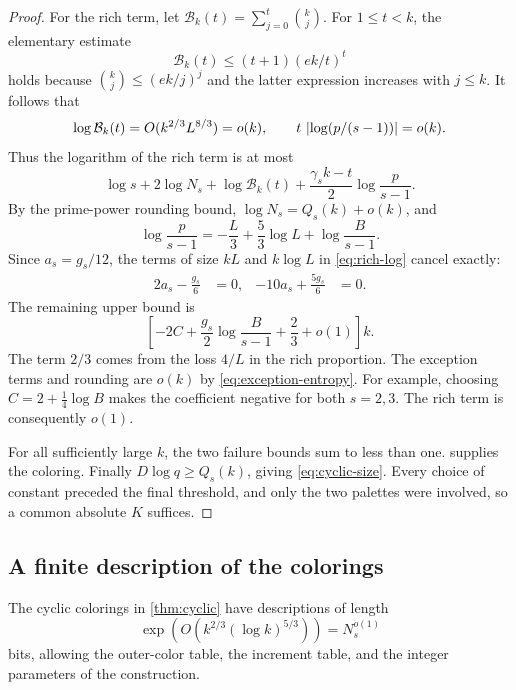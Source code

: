 \begin{proof}
For the rich term, let
\(\mathcal B_k(t)=\sum_{j=0}^t\binom kj\).
For \(1\le t<k\), the elementary estimate
\[
 \mathcal B_k(t)\le (t+1)(ek/t)^t
\]
holds because \(\binom kj\le(ek/j)^j\) and the latter expression
increases with \(j\le k\).
It follows that
\begin{equation}\label{eq:exception-entropy}
 \log\mathcal B_k(t)=O(k^{2/3}L^{8/3})=o(k),
 \qquad
 t\,\left\lvert \log(p/(s-1))\right\rvert=o(k).
\end{equation}
Thus the logarithm of the rich term is at most
\begin{equation}\label{eq:rich-log}
 \log s+2\log N_s+\log\mathcal B_k(t)
 +\frac{\gamma_s k-t}{2}\log\frac p{s-1}.
\end{equation}
By the prime-power rounding bound,
\(\log N_s=Q_s(k)+o(k)\), and
\[
 \log\frac p{s-1}
 =-\frac L3+\frac53\log L+\log\frac B{s-1}.
\]
Since \(a_s=g_s/12\), the terms of size \(kL\) and \(k\log L\)
in \eqref{eq:rich-log} cancel exactly:
\begin{align}
 2a_s-\frac{g_s}{6}&=0,&
 -10a_s+\frac{5g_s}{6}&=0.\label{eq:cancellations}
\end{align}
The remaining upper bound is
\begin{equation}\label{eq:rich-linear}
 \left[-2C+\frac{g_s}{2}\log\frac B{s-1}
                 +\frac23+o(1)\right]k.
\end{equation}
The term \(2/3\) comes from the loss \(4/L\) in the rich proportion.
The exception terms and rounding are \(o(k)\) by
\eqref{eq:exception-entropy}.
For example, choosing \(C=2+\frac14\log B\) makes the coefficient
negative for both \(s=2,3\). The rich term is consequently \(o(1)\).

For all sufficiently large \(k\), the two failure bounds sum to less
than one.  supplies the coloring.
Finally \(D\log q\ge Q_s(k)\), giving \eqref{eq:cyclic-size}.
Every choice of constant preceded the final threshold, and only the
two palettes were involved, so a common absolute \(K\) suffices.
\end{proof}

\subsection{A finite description of the colorings}

\begin{corollary}\label{cor:description}
The cyclic colorings in \cref{thm:cyclic} have descriptions of length
\[
 \exp\!\left(O(k^{2/3}(\log k)^{5/3})\right)=N_s^{o(1)}
\]
bits, allowing the outer-color table, the increment table, and the
integer parameters of the construction.
\end{corollary}

